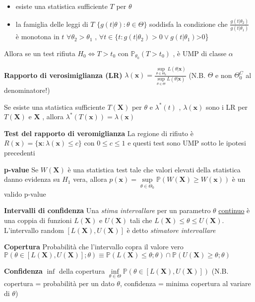 \documentclass[openany]{book} %
\begin{document}
\begin{itemize}

\item esiste una statistica sufficiente $T$ per $\theta$

\item la famiglia delle leggi di $T$ $\{g(t|\theta):\theta\in\Theta\}$ soddisfa la condizione che $\frac{g(t|\theta_2)}{g(t|\theta_1)}$ è monotona in $t$ $\forall\theta_2>\theta_1$ , $\forall t\in \{t:g(t|\theta_2)>0\vee g(t|\theta_1)$>0\}

\end{itemize}

Allora se un test rifiuta $H_0\Leftrightarrow T>t_0$ con $\mathbb{P}_{\theta_0}(T>t_0)$ , è UMP di classe $\alpha$

\textbf{Rapporto di verosimiglianza (LR)} $\lambda(\boldsymbol{x})=\frac{\underset{\theta\in\Theta_0}{\sup}L(\theta|\boldsymbol{x})}{\underset{\theta\in\Theta}{\sup}L(\theta|\boldsymbol{x})}$ (N.B. $\Theta$ e non $\Theta_0^C$ al denominatore!)

Se esiste una statistica sufficiente $T(\boldsymbol{X})$ per $\theta$ e $\lambda^*(t)$ , $\lambda(\boldsymbol{x})$ sono i LR per $T(\boldsymbol{X})$ e $\boldsymbol{X}$ , allora $\lambda^*(T(\boldsymbol{x}))=\lambda(\boldsymbol{x})$

\textbf{Test del rapporto di veromiglianza} La regione di rifiuto è $R(\boldsymbol{x})=\{\boldsymbol{x}:\lambda(\boldsymbol{x})\leq c\}$ con $0\leq c\leq 1$ e questi test sono UMP sotto le ipotesi precedenti

\textbf{p-value} Se $W(\boldsymbol{X})$ è una statistica test tale che valori elevati della statistica danno evidenza su $H_1$ vera, allora $p(\boldsymbol{x})=\underset{\theta\in\Theta_0}{\sup}\mathbb{P}(W(\boldsymbol{X})\geq W(\boldsymbol{x}))$ è un valido p-value

\textbf{Intervalli di confidenza} Una \textit{stima intervallare} per un parametro $\theta$ \underline{continuo} è una coppia di funzioni $L(\boldsymbol{X})$ e $U(\boldsymbol{X})$ tali che $L(\boldsymbol{X})\leq\theta\leq U(\boldsymbol{X})$. L'intervallo random $[L(\boldsymbol{X}),U(\boldsymbol{X})]$ è detto \textit{stimatore intervallare}

\textbf{Copertura} Probabilità che l'intervallo copra il valore vero $\mathbb{P}(\theta\in[L(\boldsymbol{X}),U(\boldsymbol{X})];\theta)\equiv \mathbb{P}(L(\boldsymbol{X})\leq\theta;\theta)\cap\mathbb{P}(U(\boldsymbol{X})\geq\theta;\theta)$

\textbf{Confidenza} $\inf$ della copertura $\underset{\theta\in\Theta}{\inf}\mathbb{P}(\theta\in[L(\boldsymbol{X}),U(\boldsymbol{X})])$ (N.B. copertura = probabilità per un dato $\theta$, confidenza = minima copertura al variare di $\theta$)
\end{document}

